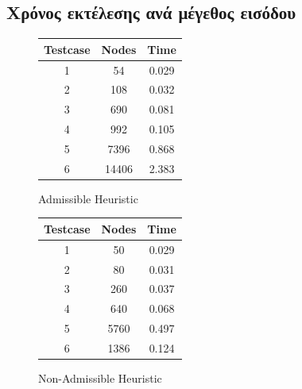 \documentclass[a4paper,9pt]{article}
\begin{document}

\subsection{Χρόνος εκτέλεσης ανά μέγεθος εισόδου}

\begin{figure}[H]
    \centering
    \begin{minipage}{0.35\textwidth}
        \begin{tabular}{| c | c | c |}
            \hline
            Testcase & Nodes & Time \\
            \hline
            \hline
            1 & 54 & 0.029\\
         2 & 108 & 0.032\\
         3 & 690 & 0.081\\
         4 & 992 & 0.105\\
         5 & 7396 & 0.868\\
         6 & 14406 & 2.383\\
            \hline
        \end{tabular}
		\caption{\small{Admissible Heuristic}}
    \end{minipage}
    \begin{minipage}{0.35\textwidth}
        \begin{tabular}{| c | c | c |}
            \hline
            Testcase & Nodes & Time \\
            \hline
            \hline
            1 & 50 & 0.029\\
         2 & 80 & 0.031\\
         3 & 260 & 0.037\\
         4 & 640 & 0.068\\
         5 & 5760 & 0.497\\
         6 & 1386 & 0.124\\
            \hline
        \end{tabular}
		\caption{\small{Non-Admissible Heuristic}}
    \end{minipage}
\end{figure}
\end{document}
